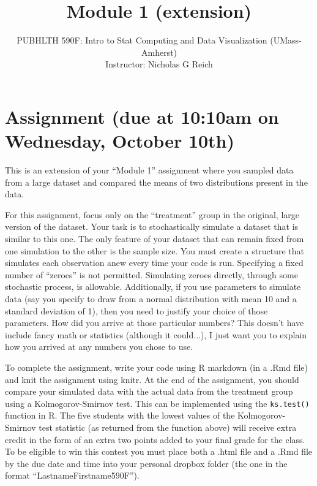 \documentclass[11pt]{article}
\title{Module 1 (extension)}
\author{PUBHLTH 590F: Intro to Stat Computing and Data Visualization (UMass-Amherst)\\ 
        Instructor: Nicholas G Reich}
\date{}
\begin{document}
\maketitle


\section{Assignment (due at 10:10am on Wednesday, October 10th) }

This is an extension of your ``Module 1'' assignment where you sampled data from a large dataset and compared the means of two distributions present in the data.

For this assignment, focus only on the ``treatment'' group in the original, large version of the dataset.  Your task is to stochastically simulate a dataset that is similar to this one. The only feature of your dataset that can remain fixed from one simulation to the other is the sample size. You must create a structure that simulates each observation anew every time your code is run. Specifying a fixed number of ``zeroes'' is not permitted. Simulating zeroes directly, through some stochastic process, is allowable. Additionally, if you use parameters to simulate data (say you specify to draw from a normal distribution with mean 10 and a standard deviation of 1), then you need to justify your choice of those parameters. How did you arrive at those particular numbers? This doesn't have include fancy math or statistics (although it could...), I just want you to explain how you arrived at any numbers you chose to use. 

To complete the assignment, write your code using R markdown (in a .Rmd file) and knit the assignment using knitr. At the end of the assignment, you should compare your simulated data with the actual data from the treatment group using a Kolmogorov-Smirnov test. This can be implemented using the {\tt ks.test()} function in R. The five students with the lowest values of the Kolmogorov-Smirnov test statistic (as returned from the function above) will receive extra credit in the form of an extra two points added to your final grade for the class. To be eligible to win this contest you must place both a .html file and a .Rmd file by the due date and time into your personal dropbox folder (the one in the format ``LastnameFirstname590F'').
\end{document}
